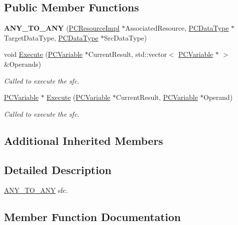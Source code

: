 \subsection*{Public Member Functions}
\begin{DoxyCompactItemize}
\item 
{\bfseries A\+N\+Y\+\_\+\+T\+O\+\_\+\+A\+NY} (\hyperlink{classpc__emulator_1_1PCResourceImpl}{P\+C\+Resource\+Impl} $\ast$Associated\+Resource, \hyperlink{classpc__emulator_1_1PCDataType}{P\+C\+Data\+Type} $\ast$Target\+Data\+Type, \hyperlink{classpc__emulator_1_1PCDataType}{P\+C\+Data\+Type} $\ast$Src\+Data\+Type)\hypertarget{classpc__emulator_1_1ANY__TO__ANY_ad553c190c23b3d076ea749a64c8ab513}{}\label{classpc__emulator_1_1ANY__TO__ANY_ad553c190c23b3d076ea749a64c8ab513}

\item 
void \hyperlink{classpc__emulator_1_1ANY__TO__ANY_abd6bf0496fa8d85b7194024b5462a0af}{Execute} (\hyperlink{classpc__emulator_1_1PCVariable}{P\+C\+Variable} $\ast$Current\+Result, std\+::vector$<$ \hyperlink{classpc__emulator_1_1PCVariable}{P\+C\+Variable} $\ast$ $>$ \&Operands)
\begin{DoxyCompactList}\small\item\em Called to execute the sfc. \end{DoxyCompactList}\item 
\hyperlink{classpc__emulator_1_1PCVariable}{P\+C\+Variable} $\ast$ \hyperlink{classpc__emulator_1_1ANY__TO__ANY_ab1268a83de8f7107a7a997a5bf1eabe6}{Execute} (\hyperlink{classpc__emulator_1_1PCVariable}{P\+C\+Variable} $\ast$Current\+Result, \hyperlink{classpc__emulator_1_1PCVariable}{P\+C\+Variable} $\ast$Operand)
\begin{DoxyCompactList}\small\item\em Called to execute the sfc. \end{DoxyCompactList}\end{DoxyCompactItemize}
\subsection*{Additional Inherited Members}


\subsection{Detailed Description}
\hyperlink{classpc__emulator_1_1ANY__TO__ANY}{A\+N\+Y\+\_\+\+T\+O\+\_\+\+A\+NY} sfc. 

\subsection{Member Function Documentation}
